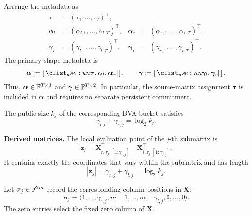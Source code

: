 Arrange the metadata as
\[
\begin{aligned}
    \bm\tau&=(\tau_1,\ldots,\tau_T)^\top,\\
    \bm\alpha_l&=(\alpha_{l,1},\ldots,\alpha_{l,T})^\top,
    &\bm\alpha_r&=(\alpha_{r,1},\ldots,\alpha_{r,T})^\top,\\
    \bm\gamma_l&=(\gamma_{l,1},\ldots,\gamma_{l,T})^\top,
    &\bm\gamma_r&=(\gamma_{r,1},\ldots,\gamma_{r,T})^\top.
\end{aligned}
\]
The primary shape metadata is
\begin{equation}
\label{eq:shape-metadata}
    \bm\alpha
    :=
    \concat{\bm\tau,\bm\alpha_l,\bm\alpha_r},
    \qquad
    \bm\gamma
    :=
    \concat{\bm\gamma_l,\bm\gamma_r}.
\end{equation}
Thus, $\bm\alpha\in{\mathbb{F}}^{T\times3}$ and
$\bm\gamma\in{\mathbb{F}}^{T\times2}$.  In particular, the source-matrix
assignment $\bm\tau$ is included in $\bm\alpha$ and requires no separate
persistent commitment.

The public size $k_j$ of the corresponding BVA bucket satisfies
\begin{equation}
\label{eq:bucket-size-gamma}
    \gamma_{l,j}+\gamma_{r,j}
    =
    \log_2 k_j.
\end{equation}

\mysmallskip\noindent
\textbf{Derived matrices.}
The local evaluation point of the $j$-th submatrix is
\begin{equation}
\label{eq:matZfromX}
    \bm z_j
    =
    \bm X_{r,\tau_j,[1:\gamma_{r,j}]}^\top
    \|
    \bm X_{l,\tau_j,[1:\gamma_{l,j}]}^\top.
\end{equation}
It contains exactly the coordinates that vary within the submatrix and has
length
\[
    |\bm z_j|
    =
    \gamma_{r,j}+\gamma_{l,j}
    =
    \log_2k_j.
\]

Let $\bm\sigma_j\in{\mathbb{F}}^{2m}$ record the corresponding column positions
in $\bm X$:
\begin{equation}
\label{eq:sigma-row}
\bm\sigma_j
=
\bigl(
1,\ldots,\gamma_{r,j},
m+1,\ldots,m+\gamma_{l,j},
0,\ldots,0
\bigr).
\end{equation}
The zero entries select the fixed zero column of $\bm X$.

